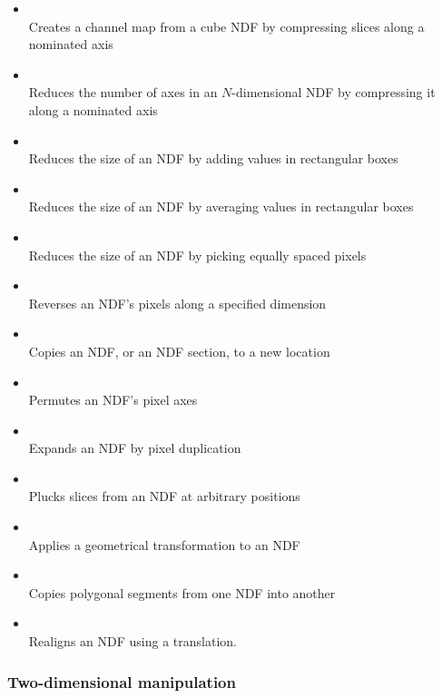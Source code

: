 \documentclass[twoside,11pt]{starlink}
\begin{document}
\begin{itemize}
\item{}\\
Creates a channel map from a cube NDF by compressing slices along a nominated axis
\item{}\\
Reduces the number of axes in an $N$-dimensional NDF by compressing it along a nominated axis
\item{}\\
Reduces the size of an NDF by adding values in rectangular boxes
\item{}\\
Reduces the size of an NDF by averaging values in rectangular boxes
\item{}\\
Reduces the size of an NDF by picking equally spaced pixels
\item{}\\
Reverses an NDF's pixels along a specified dimension
\item{}\\
Copies an NDF, or an NDF section, to a new location
\item{}\\
Permutes an NDF's pixel axes
\item{}\\
Expands an NDF by pixel duplication
\item{}\\
Plucks slices from an NDF at arbitrary positions
\item{}\\
Applies a geometrical transformation to an NDF
\item{}\\
Copies polygonal segments from one NDF into another
\item{}\\
Realigns an NDF using a translation.
\end{itemize}

\subsubsection{Two-dimensional manipulation}
\end{document}
